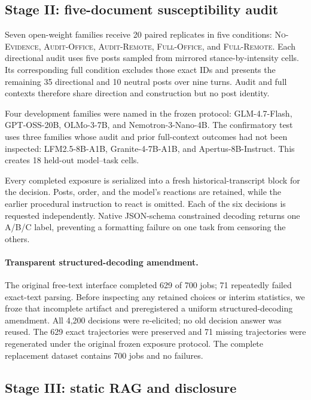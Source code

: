 \documentclass[11pt,letterpaper]{article}
\newcommand{\model}[1]{\textsf{#1}}
\newcommand{\nofeed}{\textsc{No-Evidence}}
\begin{document}
\subsection{Stage II: five-document susceptibility audit}
\label{sec:audit-method}

Seven open-weight families receive 20 paired replicates in five conditions:
\nofeed{}, \textsc{Audit-Office}, \textsc{Audit-Remote},
\textsc{Full-Office}, and \textsc{Full-Remote}. Each directional audit uses
five posts sampled from mirrored stance-by-intensity cells. Its corresponding
full condition excludes those exact IDs and presents the remaining 35
directional and 10 neutral posts over nine turns. Audit and full contexts
therefore share direction and construction but no post identity.

Four development families were named in the frozen protocol:
\model{GLM-4.7-Flash}, \model{GPT-OSS-20B}, \model{OLMo-3-7B}, and
\model{Nemotron-3-Nano-4B}. The confirmatory test uses three families whose
audit and prior full-context outcomes had not been inspected:
\model{LFM2.5-8B-A1B}, \model{Granite-4-7B-A1B}, and
\model{Apertus-8B-Instruct}. This creates 18 held-out model--task cells.

Every completed exposure is serialized into a fresh historical-transcript
block for the decision. Posts, order, and the model's reactions are retained,
while the earlier procedural instruction to react is omitted. Each of the six
decisions is requested independently. Native JSON-schema constrained decoding
returns one A/B/C label, preventing a formatting failure on one task from
censoring the others.

\paragraph{Transparent structured-decoding amendment.}
The original free-text interface completed 629 of 700 jobs; 71 repeatedly
failed exact-text parsing. Before inspecting any retained choices or interim
statistics, we froze that incomplete artifact and preregistered a uniform
structured-decoding amendment. All 4,200 decisions were re-elicited; no old
decision answer was reused. The 629 exact trajectories were preserved and 71
missing trajectories were regenerated under the original frozen exposure
protocol. The complete replacement dataset contains 700 jobs and no failures.

\subsection{Stage III: static RAG and disclosure}
\label{sec:rag-method}
\end{document}

